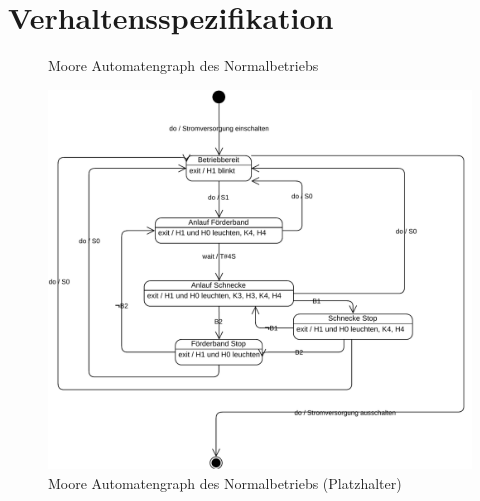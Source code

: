 \section{Verhaltensspezifikation}

\begin{figure}[H]
    \centering
    \begin{tikzpicture}[]
            
            
    \end{tikzpicture}
    \caption[Automatengraph Normalbetrieb]{Moore Automatengraph des Normalbetriebs}
    \label{fig:Bild2}
\end{figure}

\begin{figure}[H]
   \centering
   \includegraphics[width=1.0\textwidth]{Bilder/Normalbetrieb.pdf}
   \caption[Automatengraph Normalbetrieb]{Moore Automatengraph des Normalbetriebs (Platzhalter)}
   \label{fig:Bild4}
\end{figure}

